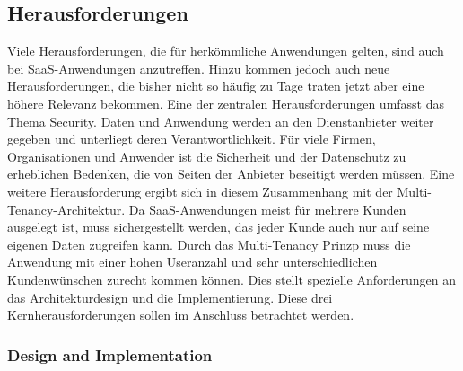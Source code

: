\subsection{Herausforderungen}
Viele Herausforderungen, die für herkömmliche Anwendungen gelten, sind auch bei SaaS-Anwendungen anzutreffen. Hinzu kommen jedoch auch neue Herausforderungen, die bisher nicht so häufig zu Tage traten jetzt aber eine höhere Relevanz bekommen. Eine der zentralen Herausforderungen umfasst das Thema Security. Daten und Anwendung werden an den Dienstanbieter weiter gegeben und unterliegt deren Verantwortlichkeit. Für viele Firmen, Organisationen und Anwender ist die Sicherheit und der Datenschutz zu erheblichen Bedenken, die von Seiten der Anbieter beseitigt werden müssen. Eine weitere Herausforderung ergibt sich in diesem Zusammenhang mit der Multi-Tenancy-Architektur. Da SaaS-Anwendungen meist für mehrere Kunden ausgelegt ist, muss sichergestellt werden, das jeder Kunde auch nur auf seine eigenen Daten zugreifen kann. Durch das Multi-Tenancy Prinzp muss die Anwendung mit einer hohen Useranzahl und sehr unterschiedlichen Kundenwünschen zurecht kommen können. Dies stellt spezielle Anforderungen an das Architekturdesign und die Implementierung. Diese drei Kernherausforderungen sollen im Anschluss betrachtet werden.

\subsubsection{Design and Implementation}


